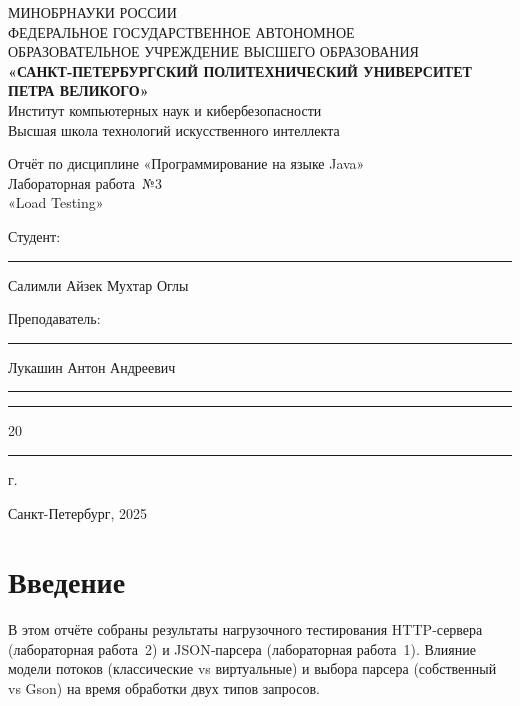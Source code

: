 \documentclass[areasetadvanced]{scrartcl}
\begin{document}
\sloppy
\thispagestyle{empty}
\begin{center}
  \large{МИНОБРНАУКИ РОССИИ}\\[0.3cm]
  \normalsize{ФЕДЕРАЛЬНОЕ ГОСУДАРСТВЕННОЕ АВТОНОМНОЕ\\
    ОБРАЗОВАТЕЛЬНОЕ УЧРЕЖДЕНИЕ ВЫСШЕГО ОБРАЗОВАНИЯ}\\[0.3cm]
  \textbf{«САНКТ‑ПЕТЕРБУРГСКИЙ ПОЛИТЕХНИЧЕСКИЙ УНИВЕРСИТЕТ ПЕТРА ВЕЛИКОГО»}\\[0.3cm]
  {Институт компьютерных наук и кибербезопасности\\
    Высшая школа технологий искусственного интеллекта}
\end{center}

\vfill

\begin{center}
  {\large Отчёт по дисциплине «Программирование на языке Java»}\\[0.5cm]
  {\huge Лабораторная работа №3\\ «Load Testing»}
\end{center}

\vfill
\begin{flushleft}
    Студент: \hspace{1.8cm} \rule[0pt]{2.5cm}{0.5pt}\hfill Салимли Айзек Мухтар Оглы\par
    \vspace{1.5cm}
    Преподаватель: \hspace{0.55cm} \rule[0pt]{2.5cm}{0.5pt}\hfill  Лукашин Антон Андреевич
\end{flushleft}
\vspace{0.5cm}
\begin{flushright}
    \guillemotleft \rule[0pt]{0.8cm}{0.5pt}\guillemotright \rule[0pt]{2cm}{0.5pt} 20\rule[0pt]{0.5cm}{0.5pt} г.
\end{flushright}
\vfill
\begin{center}
    Санкт-Петербург, 2025
\end{center}

\newpage
\tableofcontents
\newpage

\section*{Введение}
В этом отчёте собраны результаты нагрузочного тестирования HTTP‑сервера (лабораторная работа 2) и JSON‑парсера (лабораторная работа 1). Влияние модели потоков (классические vs виртуальные) и выбора парсера (собственный vs Gson) на время обработки двух типов запросов.
\end{document}
